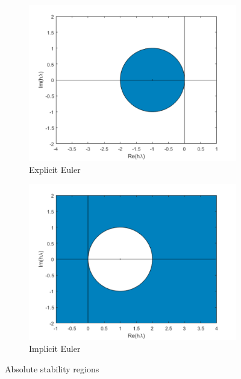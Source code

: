 \begin{figure}[h!]
\centering
    \begin{subfigure}{0.5\linewidth}
        \includegraphics[width=\linewidth]{images/1/1_6_explicit.pdf} 
        \caption{Explicit Euler}
    \end{subfigure}%
    \begin{subfigure}{0.5\linewidth}
        \includegraphics[width=\linewidth]{images/1/1_6_implicit.pdf}
        \caption{Implicit Euler}
    \end{subfigure}
    \caption{Absolute stability regions}
    \label{stability_regions}
\end{figure}